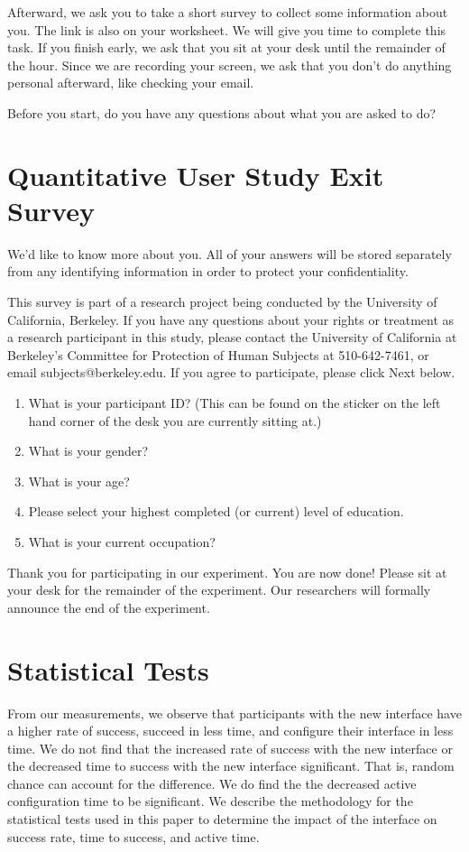 \documentclass[USenglish,oneside,twocolumn]{article}
\begin{document}
Afterward, we ask you to take a short survey to collect some information about you. The link is also on your worksheet.
We will give you time to complete this task. If you finish early, we ask that you sit at your desk until the remainder of the hour. Since we are recording your screen, we ask that you don't do anything personal afterward, like checking your email.

Before you start, do you have any questions about what you are asked to do? 

\section{Quantitative User Study Exit Survey} 
\label{quantitative-exit-survey}
We'd like to know more about you.  All of your answers will be stored separately from any identifying information in order to protect your confidentiality.

This survey is part of a research project being conducted by the University of California, Berkeley. If you have any questions about your rights or treatment as a research participant in this study, please contact the University of California at Berkeley's Committee for Protection of Human Subjects at 510-642-7461, or email subjects@berkeley.edu. If you agree to participate, please click Next below.\\

\begin{enumerate}
\item{What is your participant ID? (This can be found on the sticker on the left hand corner of the desk you are currently sitting at.)}
\item{What is your gender?}
\item{What is your age?}
\item{Please select your highest completed (or current) level of education}.
\item{What is your current occupation?}  
\end{enumerate}

Thank you for participating in our experiment. You are now done! Please sit at your desk for the remainder of the experiment. Our researchers will formally announce the end of the experiment. 

\section{Statistical Tests} 
\label{stat-tests}
From our measurements, we observe that participants with the new interface 
have a higher rate of success, succeed in less time, and configure their interface in less time. 
We do not find that the increased rate of success with the new interface or the decreased time to success with the new interface significant. That is, random chance can account for the difference. 
We do find the the decreased active configuration time to be significant. 
We describe the methodology for the statistical tests used in this paper to determine the impact of the interface on success rate, time to success, and active time. 
\end{document}
